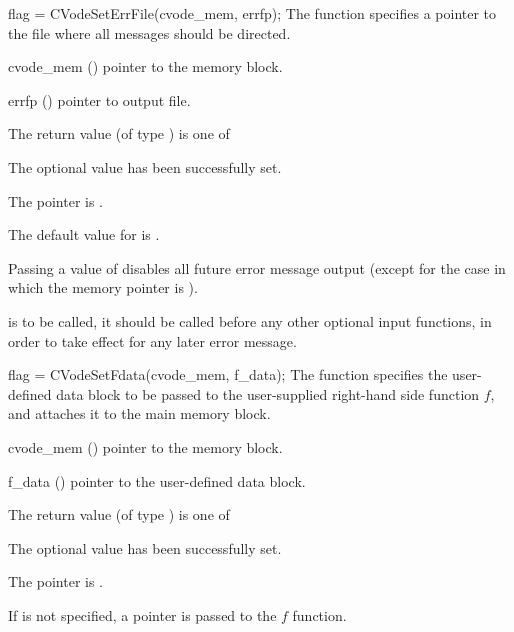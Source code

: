 {
flag = CVodeSetErrFile(cvode\_mem, errfp);
}
{
  The function  specifies a pointer to the file
  where all {\cvodes} messages should be directed.
}
{
  \begin{args}
  \item[cvode\_mem] ()
    pointer to the {\cvodes} memory block.
  \item[errfp] ()
    pointer to output file.
  \end{args}
}
{
  The return value  (of type ) is one of
  \begin{args}
  \item[\Id{CV\_SUCCESS}] 
    The optional value has been successfully set.
  \item[\Id{CV\_MEM\_NULL}]
    The  pointer is .
  \end{args}
}
{
  The default value for  is . 

  Passing a value of  disables all future error message output
  (except for the case in which the {\cvodes} memory pointer is ).

  {\warn}  is to be called, it should be called before any
  other optional input functions, in order to take effect for any later error message.
}
{
  flag = CVodeSetFdata(cvode\_mem, f\_data);
}
{
  The function  specifies the user-defined data block 
  to be passed to the user-supplied right-hand side function $f$, and attaches it to the main 
  {\cvodes} memory block.
}
{
  \begin{args}
  \item[cvode\_mem] ()
    pointer to the {\cvodes} memory block.
  \item[f\_data] ()
    pointer to the user-defined data block.
  \end{args}
}
{
  The return value  (of type ) is one of
  \begin{args}
  \item[\Id{CV\_SUCCESS}] 
    The optional value has been successfully set.
  \item[\Id{CV\_MEM\_NULL}]
    The  pointer is .
  \end{args}
}
{
  If  is not specified, a  pointer is
  passed to the $f$ function.
}
